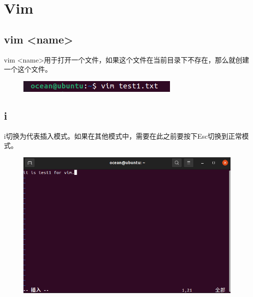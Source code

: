 \documentclass{article}
\begin{document}
\section{Vim}
\subsection{vim <name>}
vim <name>用于打开一个文件，如果这个文件在当前目录下不存在，那么就创建一个这个文件。
\begin{figure}[H]
    \centering
    \includegraphics[width=1\linewidth]{vim.png}
\end{figure}

\subsection{i}
i切换为代表插入模式。如果在其他模式中，需要在此之前要按下Esc切换到正常模式。
\begin{figure}[H]
    \centering
    \includegraphics[width=1\linewidth]{insert.png}
\end{figure}
\end{document}
